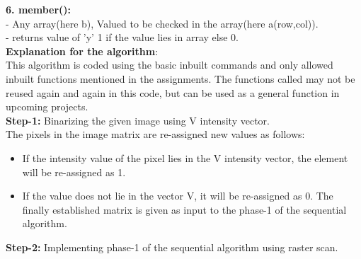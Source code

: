 \documentclass{report}
\begin{document}
\noindent \textbf{6. member():}\\
\textit{}- Any array(here b), Valued to be checked in the array(here a(row,col)). \\
\textit{}- returns value of 'y' 1 if the value lies in array else 0.\\ 

\noindent \textbf{Explanation for the algorithm}:\\

\noindent This algorithm is coded using the basic inbuilt commands and only allowed inbuilt functions mentioned in the assignments. The functions called may not be reused again and again in this code, but can be used as a general function in upcoming projects.\\

\noindent \textbf{Step-1:} Binarizing the given image using V intensity vector.\\

\noindent The pixels in the image matrix are re-assigned new values as follows:
\begin{itemize}
\item If the intensity value of the pixel lies in the V intensity vector, the element will be re-assigned as 1.
\item If the value does not lie in the vector V, it will be re-assigned as 0. The finally  established matrix is given as input to the phase-1 of the sequential algorithm.\\
\end{itemize}

\noindent \textbf{Step-2:} Implementing phase-1 of the sequential algorithm using raster scan.\\
\end{document}
